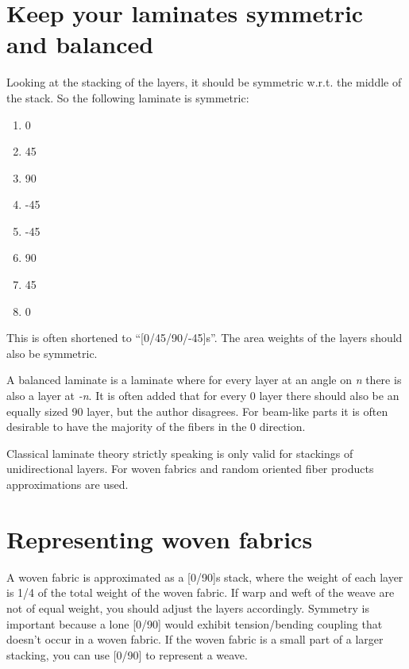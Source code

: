 \documentclass[a4paper,landscape,oneside,11pt,twocolumn]{memoir}
\begin{document}
\section{Keep your laminates symmetric and balanced} %

Looking at the stacking of the layers, it should be symmetric w.r.t. the
middle of the stack. So the following laminate is symmetric:

\begin{enumerate}
    \item 0\textdegree
    \item 45\textdegree
    \item 90\textdegree
    \item -45\textdegree
    \item -45\textdegree
    \item 90\textdegree
    \item 45\textdegree
    \item 0\textdegree
\end{enumerate}

This is often shortened to “[0/45/90/-45]s”. The area weights of the layers
should also be symmetric.

A balanced laminate is a laminate where for every layer at an angle on
\emph{n}\textdegree{} there is also a layer at \emph{-n}\textdegree.
It is often added that for every 0\textdegree{} layer there should also be an
equally sized 90\textdegree{} layer, but the author disagrees. For beam-like
parts it is often desirable to have the majority of the fibers in the
0\textdegree{} direction.

Classical laminate theory strictly speaking is only valid for stackings of
unidirectional layers. For woven fabrics and random oriented fiber products
approximations are used.

\section{Representing woven fabrics}

A woven fabric is approximated as a [0\textdegree/90\textdegree]s stack, where
the weight of each layer is 1/4 of the total weight of the woven fabric. If
warp and weft of the weave are not of equal weight, you should adjust the
layers accordingly. Symmetry is important because a lone
[0\textdegree/90\textdegree] would exhibit tension/bending coupling that
doesn't occur in a woven fabric.
If the woven fabric is a small part of a larger stacking, you can use
[0\textdegree/90\textdegree] to represent a weave.
\end{document}
